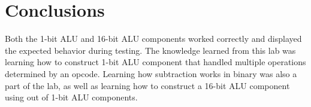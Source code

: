 \documentclass[11pt]{report}
\begin{document}
\section*{Conclusions}
Both the 1-bit ALU and 16-bit ALU components worked correctly and displayed the expected behavior
during testing. The knowledge learned from this lab was learning how to construct 1-bit ALU
component that handled multiple operations determined by an opcode. Learning how subtraction works
in binary was also a part of the lab, as well as learning how to construct a 16-bit ALU component
using out of 1-bit ALU components.
% 
% 
% 
% 
% 
% 
\end{document}
